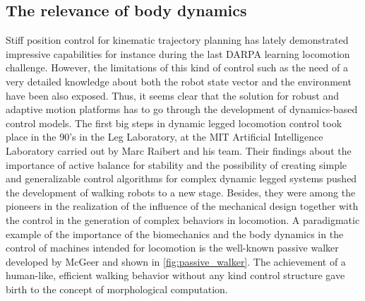\subsection{The relevance of body dynamics} %
\label{sub:dynamics_control}
Stiff position control for kinematic trajectory planning has lately demonstrated impressive capabilities for instance during the last DARPA learning locomotion challenge.
However, the limitations of this kind of control such as the need of a very detailed knowledge  about both the robot state vector and the environment have been also exposed.
Thus, it seems clear that the solution for robust and adaptive motion platforms has to go through the development of dynamics-based control models.
The first big steps in dynamic legged locomotion control took place in the 90's in the Leg Laboratory, at the MIT Artificial Intelligence Laboratory carried out by Marc Raibert and his team.
Their findings about the importance of active balance for stability and the possibility of creating simple and generalizable control algorithms for complex dynamic legged systems \cite{mit_leg_lab1} pushed the development of walking robots to a new stage.
Besides, they were among the pioneers in the realization of the influence of the mechanical design together with the control in the generation of complex behaviors in locomotion.
A paradigmatic example of the importance of the biomechanics and the body dynamics in the control of machines intended for locomotion is the well-known passive walker developed by McGeer \cite{passive_walking} and shown in \ref{fig:passive_walker}. 
The achievement of a human-like, efficient walking behavior without any kind control structure gave birth to the concept of morphological computation.

